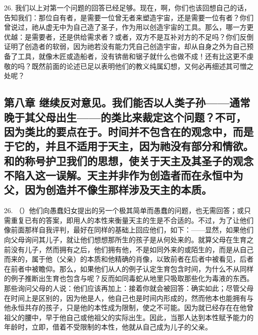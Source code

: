 26. 我们以上对第一个问题的回答已经足够。现在，啊，你们也该回想自己的话，告知我们：那位自有者，是需要一位曾无者来塑造宇宙，还是需要一位有者？你们曾说过，祂从虚无中为自己造了圣子，作为用以创造宇宙的工具。那么，哪一方更优越：是需要者，还是供给需求者？或者，双方不是互补对方的不足吗？你们反倒证明了创造者的软弱，因为祂若没有能力凭自己创造宇宙，却从自身之外为自己预备了工具，就像木匠或造船者，没有锛凿和锯子就什么也做不成！还有比这更不虔敬的吗？既然前面的论述已足以表明他们的教义纯属幻想，又何必再细述其可憎之处呢？\par


\subsection{第八章 继续反对意见。我们能否以人类子孙——通常晚于其父母出生——的类比来裁定这个问题？不可，因为类比的要点在于。时间并不包含在的观念中，而是于它的，并且不适用于天主，因为祂没有部分和情欲。和的称号护卫我们的思想，使关于天主及其圣子的观念不陷入这一误解。天主并非作为创造者而在永恒中为父，因为创造并不像生那样涉及天主的本质。}

26. （）他们向愚蠢妇女提出的另一个极其简单而愚蠢的问题，也无需回答；或只需重复已有的答案，即用人的本性来衡量天主的生是不合适的。不过，为了让他们像前面那样自我评判，最好在同样的基础上回应他们，如下：——显然，如果他们向父母询问其儿子，就让他们想想那所生的孩子是从何处来的。就算父母在生育之前没有儿子，然而拥有之后，他们拥有他，不是如同外来的或陌生的，而是从自己而来的，属于他（父亲）的本质和他精确的肖像，以致前者在后者中被看见，后者在前者中被瞻仰。那么，如果他们从人的例子认定生育包含时间，为什么不从同样的例子推断出生育也包含与呢？反而如同毒蛇从地里只吸取那些化为毒液的东西。那些询问父母的人说：他们应该再加上：接着你就会被回答：确实如此；尽管父母在时间上是区别的，因为他是人，他自己也是时间内形成的，然而他本也能拥有与他永恒共存的孩子，只是他的本性成为限制，使之不可能。因为就已经存在在他曾祖父的腰中，早于他自己或他祖父的实际出生。因此，当那人达到本性赋予能力的年龄时，立即，借着不受限制的本性，他就从自己成为儿子的父亲。\par

